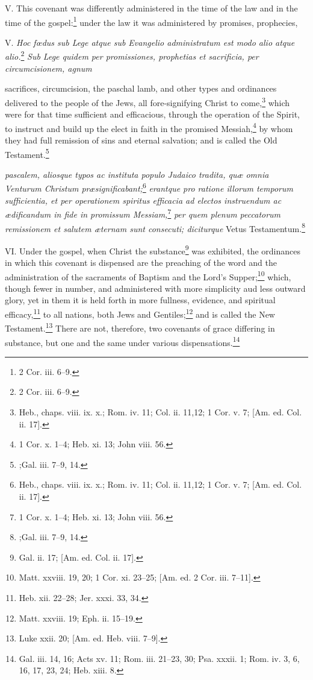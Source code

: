 V. This covenant was differently administered in the time of the law and in the time of the gospel:\footnote{2 Cor. iii. 6–9.} under the law it was administered by promises, prophecies,

V. \emph{Hoc fœdus sub Lege atque sub Evangelio administratum est modo alio atque alio.}\footnote{2 Cor. iii. 6–9.}\emph{ Sub Lege quidem per promissiones, prophetias et sacrificia, per circumcisionem, agnum }

sacrifices, circumcision, the paschal lamb, and other types and ordinances delivered to the people of the Jews, all fore-signifying Christ to come,\footnote{Heb., chaps. viii. ix. x.; Rom. iv. 11; Col. ii. 11,12; 1 Cor. v. 7; [Am. ed. Col. ii. 17].} which were for that time sufficient and efficacious, through the operation of the Spirit, to instruct and build up the elect in faith in the promised Messiah,\footnote{1 Cor. x. 1–4; Heb. xi. 13; John viii. 56.} by whom they had full remission of sins and eternal salvation; and is called the Old Testament.\footnote{;Gal. iii. 7–9, 14.}

\emph{pascalem, aliosque typos ac instituta populo Judaico tradita, quæ omnia Venturum Christum præsignificabant;}\footnote{Heb., chaps. viii. ix. x.; Rom. iv. 11; Col. ii. 11,12; 1 Cor. v. 7; [Am. ed. Col. ii. 17].}\emph{ erantque pro ratione illorum temporum sufficientia, et per operationem spiritus efficacia ad electos instruendum ac ædificandum in fide in promissum Messiam,}\footnote{1 Cor. x. 1–4; Heb. xi. 13; John viii. 56.}\emph{ per quem plenum peccatorum remissionem et salutem æternam sunt consecuti; diciturque} Vetus Testamentum.\footnote{;Gal. iii. 7–9, 14.}

VI. Under the gospel, when Christ the substance\footnote{Gal. ii. 17; [Am. ed. Col. ii. 17].} was exhibited, the ordinances in which this covenant is dispensed are the preaching of the word and the administration of the sacraments of Baptism and the Lord's Supper;\footnote{Matt. xxviii. 19, 20; 1 Cor. xi. 23–25; [Am. ed. 2 Cor. iii. 7–11].} which, though fewer in number, and administered with more simplicity aud less outward glory, yet in them it is held forth in more fullness, evidence, and spiritual efficacy,\footnote{Heb. xii. 22–28; Jer. xxxi. 33, 34.} to all nations, both Jews and Gentiles;\footnote{Matt. xxviii. 19; Eph. ii. 15–19.} and is called the New Testament.\footnote{Luke xxii. 20; [Am. ed. Heb. viii. 7–9].} There are not, therefore, two covenants of grace differing in substance, but one and the same under various dispensations.\footnote{Gal. iii. 14, 16; Acts xv. 11; Rom. iii. 21–23, 30; Psa. xxxii. 1; Rom. iv. 3, 6, 16, 17, 23, 24; Heb. xiii. 8.}

